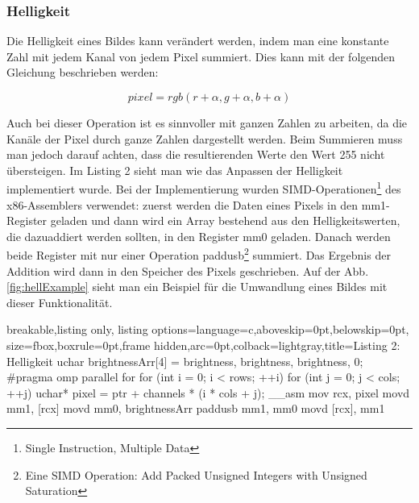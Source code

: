 \documentclass[11pt]{amsart}
\begin{document}
\subsubsection{Helligkeit}
Die Helligkeit eines Bildes kann verändert werden, indem man eine konstante Zahl mit jedem Kanal von jedem Pixel summiert. Dies kann mit der folgenden Gleichung beschrieben werden:

 \begin{equation}\label{helligkeit}
 	pixel = rgb(r+\alpha, g+\alpha, b+\alpha)
\end{equation}


Auch bei dieser Operation ist es sinnvoller mit ganzen Zahlen zu arbeiten, da die Kanäle der Pixel durch ganze Zahlen dargestellt werden. Beim Summieren muss man jedoch darauf achten, dass die resultierenden Werte den Wert 255 nicht übersteigen. Im Listing 2 sieht man wie das Anpassen der Helligkeit implementiert wurde. Bei der Implementierung wurden SIMD-Operationen\footnote{Single Instruction, Multiple Data} des x86-Assemblers verwendet: zuerst werden die Daten eines Pixels in den mm1-Register geladen und dann wird ein Array bestehend aus den Helligkeitswerten, die dazuaddiert werden sollten, in den Register mm0 geladen. Danach werden beide Register mit nur einer Operation paddusb\footnote{Eine SIMD Operation: Add Packed Unsigned Integers with Unsigned Saturation} summiert. Das Ergebnis der Addition wird dann in den Speicher des Pixels geschrieben. Auf der Abb. \ref{fig:hellExample} sieht man ein Beispiel für die Umwandlung eines Bildes mit dieser Funktionalität.


  \begin{tcblisting}{breakable,listing only,
  listing options={language=c,aboveskip=0pt,belowskip=0pt},
  size=fbox,boxrule=0pt,frame hidden,arc=0pt,colback=lightgray,title=Listing 2: Helligkeit}
uchar brightnessArr[4] = {brightness, brightness, brightness, 0};
#pragma omp parallel for
     for (int i = 0; i < rows; ++i) {
         for (int j = 0; j < cols; ++j) {
             uchar* pixel = ptr + channels * (i * cols + j);
             __asm {
                     mov rcx, pixel
                     movd mm1, [rcx]
                     movd mm0, brightnessArr
                     paddusb mm1, mm0
                     movd [rcx], mm1
             }
        }
     }
\end{tcblisting}
\end{document}
